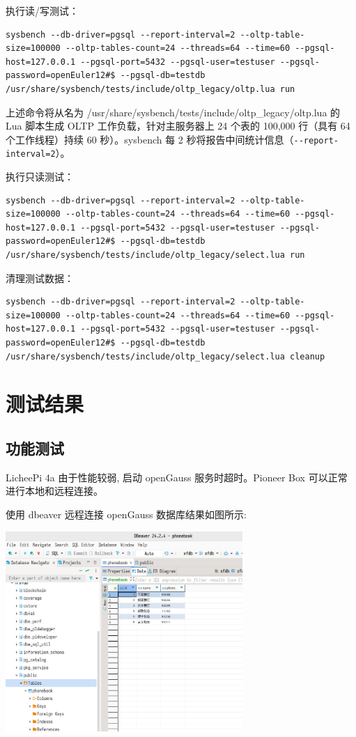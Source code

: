 \documentclass{article}
\begin{document}
执行读/写测试：

\begin{verbatim}
sysbench --db-driver=pgsql --report-interval=2 --oltp-table-size=100000 --oltp-tables-count=24 --threads=64 --time=60 --pgsql-host=127.0.0.1 --pgsql-port=5432 --pgsql-user=testuser --pgsql-password=openEuler12#$ --pgsql-db=testdb /usr/share/sysbench/tests/include/oltp_legacy/oltp.lua run
\end{verbatim}
上述命令将从名为 /usr/share/sysbench/tests/include/oltp\_legacy/oltp.lua 的 Lua 脚本生成 OLTP 工作负载，针对主服务器上 24 个表的 100,000 行（具有 64 个工作线程）持续 60 秒）。sysbench 每 2 秒将报告中间统计信息（\verb!--report-interval=2!）。

执行只读测试：

\begin{verbatim}
sysbench --db-driver=pgsql --report-interval=2 --oltp-table-size=100000 --oltp-tables-count=24 --threads=64 --time=60 --pgsql-host=127.0.0.1 --pgsql-port=5432 --pgsql-user=testuser --pgsql-password=openEuler12#$ --pgsql-db=testdb /usr/share/sysbench/tests/include/oltp_legacy/select.lua run
\end{verbatim}

清理测试数据：

\begin{verbatim}
sysbench --db-driver=pgsql --report-interval=2 --oltp-table-size=100000 --oltp-tables-count=24 --threads=64 --time=60 --pgsql-host=127.0.0.1 --pgsql-port=5432 --pgsql-user=testuser --pgsql-password=openEuler12#$ --pgsql-db=testdb /usr/share/sysbench/tests/include/oltp_legacy/select.lua cleanup
\end{verbatim}


\section{测试结果}

\subsection{功能测试}
LicheePi 4a 由于性能较弱, 启动 openGauss 服务时超时。Pioneer Box 可以正常进行本地和远程连接。

使用 dbeaver 远程连接 openGauss 数据库结果如图所示:

\begin{center}
\includegraphics[width=9cm]{./image/6.png}
\end{center}
\end{document}
